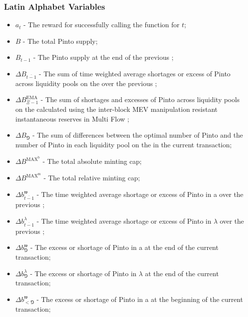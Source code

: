 \documentclass[class=article, crop=false]{standalone}
\begin{document}

\subsubsection{Latin Alphabet Variables}

\begin{itemize}[topsep=0pt, itemsep=3pt,leftmargin=16pt]
    \item[] $a_{t}$ - The reward for successfully calling the  function for $t$;
    \item[] $B$ - The total Pinto supply;
    \item[] $B_{t-1}$ - The Pinto supply at the end of the previous ;
    \item[] $\Delta B_{\overline{t-1}}$ - The sum of time weighted average shortages or excess of Pinto across liquidity pools on the  over the previous ;
    \item[] $\Delta B_{\Xi-1}^{\text{EMA}}$ - The sum of shortages and excesses of Pinto across liquidity pools on the  calculated using the inter-block MEV manipulation resistant instantaneous reserves in Multi Flow ;
    \item[] $\Delta B_{\Game}$ - The sum of differences between the optimal number of Pinto and the number of Pinto in each liquidity pool on the  in the current transaction;
    \item[] $\Delta B^{\text{MAX}^{\text{b}}}$ - The total absolute minting cap;
    \item[] $\Delta B^{\text{MAX}^{\text{m}}}$ - The total relative minting cap;
    \item[] $\Delta b_{\overline{t-1}}^{\mathfrak{w}}$ - The time weighted average shortage or excess of Pinto in a  over the previous ;
    \item[] $\Delta b_{\overline{t-1}}^{\lambda}$ - The time weighted average shortage or excess of Pinto in $\lambda$ over the previous ;
    \item[] $\Delta b_{\Game}^{\mathfrak{w}}$ - The excess or shortage of Pinto in a  at the end of the current transaction;
    \item[] $\Delta b_{\Game}^{\lambda}$ - The excess or shortage of Pinto in $\lambda$ at the end of the current transaction;
    \item[] $\Delta b_{<\Game}^{\mathfrak{w}}$ - The excess or shortage of Pinto in a  at the beginning of the current transaction;

\end{itemize}
\end{document}
